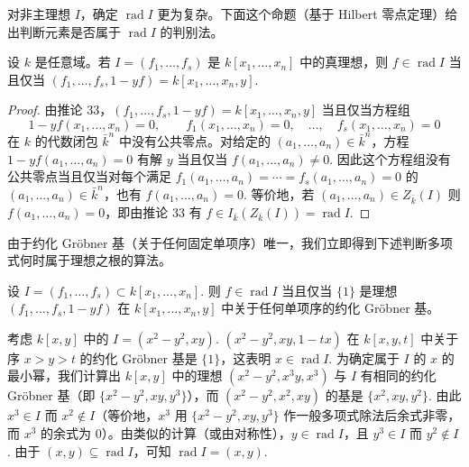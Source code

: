 对非主理想 \(I\)，确定 \(\operatorname{rad}I\) 更为复杂。下面这个命题（基于 Hilbert 零点定理）给出判断元素是否属于 \(\operatorname{rad}I\) 的判别法。

\begin{proposition}\label{pro:15.34}
设 \(k\) 是任意域。若 \(I = (f_1, \ldots, f_s)\) 是 \(k[x_1, \ldots, x_n]\) 中的真理想，则 \(f \in \operatorname{rad}I\) 当且仅当 \((f_1, \ldots, f_s, 1-yf) = k[x_1, \ldots, x_n, y]\).
\end{proposition}

\begin{proof}
由推论 33，\((f_1, \ldots, f_s, 1-yf) = k[x_1, \ldots, x_n, y]\) 当且仅当方程组
\[
1-yf(x_1, \ldots, x_n) = 0, \qquad f_1(x_1, \ldots, x_n) = 0, \quad \ldots, \quad f_s(x_1, \ldots, x_n) = 0
\]
在 \(k\) 的代数闭包 \(\bar k^n\) 中没有公共零点。对给定的 \((a_1, \ldots, a_n) \in \bar k^n\)，方程 \(1-yf(a_1, \ldots, a_n) = 0\) 有解 \(y\) 当且仅当 \(f(a_1, \ldots, a_n) \neq 0\). 因此这个方程组没有公共零点当且仅当对每个满足 \(f_1(a_1, \ldots, a_n) = \cdots = f_s(a_1, \ldots, a_n) = 0\) 的 \((a_1, \ldots, a_n) \in \bar k^n\)，也有 \(f(a_1, \ldots, a_n) = 0\). 等价地，若 \((a_1, \ldots, a_n) \in Z_{\bar k}(I)\) 则 \(f(a_1, \ldots, a_n) = 0\)，即由推论 33 有 \(f \in I_{\bar k}(Z_{\bar k}(I)) = \operatorname{rad}I\).
\end{proof}

由于约化 Gröbner 基（关于任何固定单项序）唯一，我们立即得到下述判断多项式何时属于理想之根的算法。

\begin{corollary}\label{cor:15.35}
设 \(I = (f_1, \ldots, f_s) \subset k[x_1, \ldots, x_n]\). 则 \(f \in \operatorname{rad}I\) 当且仅当 \(\{1\}\) 是理想 \((f_1, \ldots, f_s, 1-yf)\) 在 \(k[x_1, \ldots, x_n, y]\) 中关于任何单项序的约化 Gröbner 基。
\end{corollary}

\begin{example}
考虑 \(k[x,y]\) 中的 \(I = (x^2-y^2, xy)\). \((x^2-y^2, xy, 1-tx)\) 在 \(k[x,y,t]\) 中关于序 \(x > y > t\) 的约化 Gröbner 基是 \(\{1\}\)，这表明 \(x \in \operatorname{rad}I\). 为确定属于 \(I\) 的 \(x\) 的最小幂，我们计算出 \(k[x,y]\) 中的理想 \((x^2-y^2, x^3y, x^3)\) 与 \(I\) 有相同的约化 Gröbner 基（即 \(\{x^2-y^2, xy, y^3\}\)），而 \((x^2-y^2, x^2, xy)\) 的基是 \(\{x^2, xy, y^2\}\). 由此 \(x^3 \in I\) 而 \(x^2 \notin I\)（等价地，\(x^3\) 用 \(\{x^2-y^2, xy, y^3\}\) 作一般多项式除法后余式非零，而 \(x^3\) 的余式为 0）。由类似的计算（或由对称性），\(y \in \operatorname{rad}I\)，且 \(y^3 \in I\) 而 \(y^2 \notin I\). 由于 \((x,y) \subseteq \operatorname{rad}I\)，可知 \(\operatorname{rad}I = (x,y)\).
\end{example}


